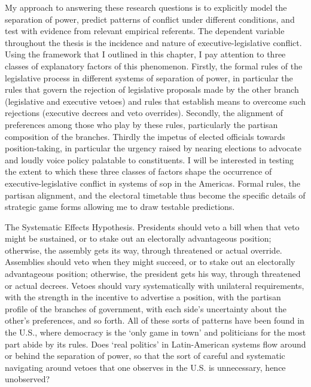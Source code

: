 My approach to answering these research questions is to explicitly model the separation of power, predict patterns of conflict under different conditions, and test with evidence from relevant empirical referents.  The dependent variable throughout the thesis is the incidence and nature of executive-legislative conflict.  Using the framework that I outlined in this chapter, I pay attention to three classes of explanatory factors of this phenomenon.  Firstly, the formal rules of the legislative process in different systems of separation of power, in particular the rules that govern the rejection of legislative proposals made by the other branch (legislative and executive vetoes) and rules that establish means to overcome such rejections (executive decrees and veto overrides).  Secondly, the alignment of preferences among those who play by these rules, particularly the partisan composition of the branches.  Thirdly the impetus of elected officials towards position-taking, in particular the urgency raised by nearing elections to advocate and loudly voice policy palatable to constituents.  I will be interested in testing the extent to which these three classes of factors shape the occurrence of executive-legislative conflict in systems of sop in the Americas.  Formal rules, the partisan alignment, and the electoral timetable thus become the specific details of strategic game forms allowing me to draw testable predictions.  

The Systematic Effects Hypothesis.  Presidents should veto a bill when that veto might be sustained, or to stake out an electorally advantageous position; otherwise, the assembly gets its way, through threatened or actual override.  Assemblies should veto when they might succeed, or to stake out an electorally advantageous position; otherwise, the president gets his way, through threatened or actual decrees.  Vetoes should vary systematically with unilateral requirements, with the strength in the incentive to advertise a position, with the partisan profile of the branches of government, with each side's uncertainty about the other's preferences, and so forth.  All of these sorts of patterns have been found in the U.S., where democracy is the ‘only game in town' \citep{przeworski.1991} and politicians for the most part abide by its rules.  Does ‘real politics' in Latin-American systems flow around or behind the separation of power, so that the sort of careful and systematic navigating around vetoes that one observes in the U.S. is unnecessary, hence unobserved?  

